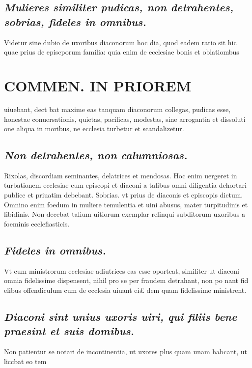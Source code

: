 \documentclass{article}
\begin{document}
\begin{pages}
\subsection*{\textit{Mulieres similiter pudicas, non detrahentes, sobrias, fideles in omnibus. }}\pstart Videtur sine dubio de uxoribus diaconorum hoc dia, quod eadem ratio sit hic quae prius de episcporum familia: quia enim de ecclesiae bonis et oblatiombus  \pend
\section*{COMMEN. IN PRIOREM }
\marginpar{[ p.84 ]}\pstart uiuebant, dect bat maxime eas tanquam diaconorum collegas, pudicas esse, honestae conuersationis, quietas, pacificas, modestas, sine arrogantia et dissoluti one aliqua in moribus, ne ecclesia turbetur et scandalizetur.  \pend
{}
{}
\subsection*{\textit{Non detrahentes, non calumniosas. }}\pstart Rixolas, discordiam seminantes, delatrices et mendosas. Hoc enim uergeret in turbationem ecclesiae cum episcopi et diaconi a talibus omni diligentia dehortari publice et priuatim debebant.  \pend\pstart Sobrias. vt prius de diaconis et episcopis dictum. Omnino enim foedum in muliere temulentia et uini abusus, mater turpitudinis et libidinis. Non decebat talium uitiorum exemplar relinqui subditorum uxoribus a foeminis ecclefiasticis.  \pend
{}
{}
\subsection*{\textit{Fideles in omnibus. }}\pstart Vt cum ministrorum ecclesiae adiutrices eas esse oporteat, similiter ut diaconi omnia fidelissime dispensent, nihil pro se per fraudem detrahant, non po nant fid elibus offendiculum cum de ecclesia uiuant ei£ dem quam fidelissime ministrent.  \pend
{}
{}
\subsection*{\textit{Diaconi sint unius uxoris uiri, qui filiis bene praesint et suis domibus. }}\pstart Non patientur se notari de incontinentia, ut uxores plus quam unam habcant, ut liccbat eo tem\pend

\end{pages}
\end{document}
